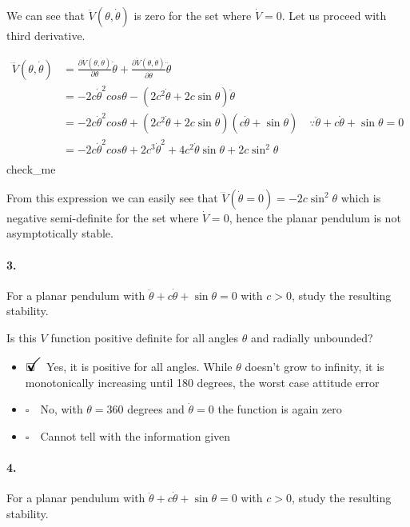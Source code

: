 \documentclass[12pt, a4paper]{article}
\newcommand{\ans}{\item[]$\rlap{\LARGE{\checkmark}}\square\quad$}
\newcommand{\noans}{\item[]$\square\quad$}
\begin{document}
We can see that $\ddot{V}(\theta,\dot{\theta})$ is zero for the set where $\dot{V}=0$. Let us proceed with third derivative.

\begin{equation*}
    \begin{split}
        \dddot{V}(\theta,\dot{\theta})&=\frac{\partial\ddot{V}(\theta,\dot{\theta})}{\partial\theta}\dot{\theta}+\frac{\partial\ddot{V}(\theta,\dot{\theta})}{\partial\dot{\theta}}\ddot{\theta}\\
        &=-2c\dot{\theta}^{2}cos\theta-(2c^{2}\dot{\theta}+2c\sin{\theta})\ddot{\theta}\\
        &=-2c\dot{\theta}^{2}cos\theta+(2c^{2}\dot{\theta}+2c\sin{\theta})(c\dot{\theta}+\sin{\theta})\quad\because\ddot{\theta}+c\dot{\theta}+\sin\theta = 0\\
        &=-2c\dot{\theta}^{2}cos\theta+2c^{3}\dot{\theta}^{2}+4c^{2}\dot{\theta}\sin{\theta}+2c\sin^{2}{\theta}\\
    \end{split}
\end{equation*}
check\_me

From this expression we can easily see that $\dddot{V}(\dot{\theta}=0)=-2c\sin^{2}{\theta}$ which is negative semi-definite for the set where $\dot{V}=0$, hence the planar pendulum is not asymptotically stable.

\paragraph{3.}
For a planar pendulum with $\ddot{\theta}+c\dot{\theta}+\sin\theta = 0$ with $c>0$, study the resulting stability. \medskip

Is this $V$ function positive definite for all angles $\theta$ and radially unbounded?

\begin{itemize}
    \ans Yes, it is positive for all angles. While $\theta$ doesn't grow to infinity, it is monotonically increasing until 180 degrees, the worst case attitude error
    \noans No, with $\theta = 360$ degrees and $\dot{\theta} = 0$ the function is again zero
    \noans Cannot tell with the information given
\end{itemize}

\paragraph{4.}
For a planar pendulum with $\ddot{\theta}+c\dot{\theta}+\sin\theta = 0$ with $c>0$, study the resulting stability. \medskip
\end{document}
